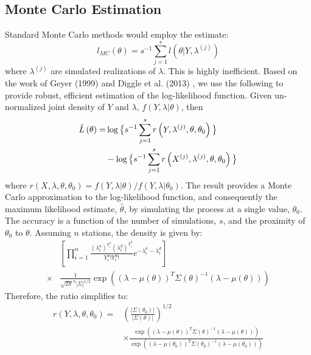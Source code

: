 \documentclass{acm_proc_article-sp}
\begin{document}
\subsection{Monte Carlo Estimation} \label{mc_estimation}
Standard Monte Carlo methods would employ the estimate:
\begin{equation}
l_{MC} (\theta) = s^{-1} \sum_{j=1}^s l \left( \theta | Y, \lambda^{(j)} \right)
\end{equation}
\noindent where $\lambda^{(j)}$ are simulated realizations of $\lambda$.  This is highly inefficient.  Based on the work of Geyer (1999) \cite{geyer:likinf} and Diggle et al. (2013) \cite{diggle:spatial}, we use the following to provide robust, efficient estimation of the log-likelihood function.  Given un-normalized joint density of $Y$ and $\lambda$, $f(Y, \lambda | \theta)$, then 
\begin{align}
\hat{L} \left( \theta \right) =& \log \big \{ s^{-1} \sum_{j=1}^s r \left( Y , \lambda^{(j)} , \theta, \theta_0 \right) \big \} \label{approx_lik} \\
&- \log \big \{ s^{-1} \sum_{j=1}^s r \left( X^{(j)} , \lambda^{(j)} , \theta, \theta_0 \right) \big \} \notag
\end{align}
\noindent where $r(X, \lambda, \theta, \theta_0) = f(Y, \lambda | \theta)/f(Y, \lambda | \theta_0)$. The result provides a Monte Carlo approximation to the log-likelihood function, and consequently the maximum likelihood estimate, $\hat{\theta}$, by simulating the process at a single value, $\theta_0$.  The accuracy is a function of the number of simulations, $s$, and the proximity of $\theta_0$ to $\theta$.   Assuming $n$ stations, the density is given by:
\begin{align*}
&\left[ \prod_{i=1}^n \frac{(\lambda_i^a)^{Y_i^a}(\lambda_i^d)^{Y_i^d}}{Y_i^a ! Y_i^d !} e^{-\lambda_i^a - \lambda_i^d} \right] \\
\times& \frac{1}{\sqrt{2 \pi}^n |\Sigma|^{1/2}} \exp \left( (\lambda - \mu(\theta))^T \Sigma(\theta)^{-1} (\lambda - \mu(\theta) ) \right)
\end{align*}
Therefore, the ratio simplifies to:
\begin{align*}
r(Y,\lambda, \theta, \theta_0) =& \left(\frac{|\Sigma (\theta_0)|}{|\Sigma (\theta)|} \right)^{1/2} \\
&\times \frac{\exp \left( (\lambda - \mu(\theta))^T \Sigma(\theta)^{-1} (\lambda - \mu(\theta) ) \right)}{\exp \left( (\lambda - \mu(\theta_0))^T \Sigma(\theta_0)^{-1} (\lambda - \mu(\theta_0) ) \right)} \\
\end{align*}
\end{document}
